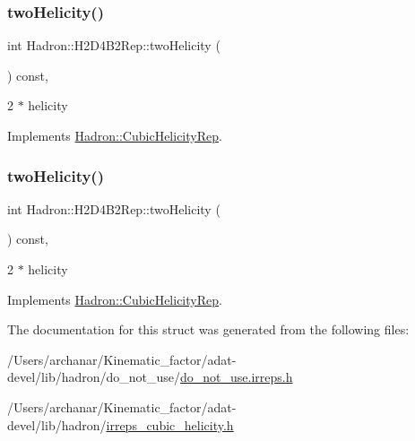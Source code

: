 \subsubsection{\texorpdfstring{twoHelicity()}{twoHelicity()}\hspace{0.1cm}{\footnotesize\ttfamily [2/3]}}
{\footnotesize\ttfamily int Hadron\+::\+H2\+D4\+B2\+Rep\+::two\+Helicity (\begin{DoxyParamCaption}{ }\end{DoxyParamCaption}) const\hspace{0.3cm}{\ttfamily [inline]}, {\ttfamily [virtual]}}

2 $\ast$ helicity 

Implements \mbox{\hyperlink{structHadron_1_1CubicHelicityRep_af507aa56fc2747eacc8cb6c96db31ecc}{Hadron\+::\+Cubic\+Helicity\+Rep}}.

\mbox{\label{structHadron_1_1H2D4B2Rep_a21f6e9059862c9e6f8b6d5cbb10d8b80}} 
\subsubsection{\texorpdfstring{twoHelicity()}{twoHelicity()}\hspace{0.1cm}{\footnotesize\ttfamily [3/3]}}
{\footnotesize\ttfamily int Hadron\+::\+H2\+D4\+B2\+Rep\+::two\+Helicity (\begin{DoxyParamCaption}{ }\end{DoxyParamCaption}) const\hspace{0.3cm}{\ttfamily [inline]}, {\ttfamily [virtual]}}

2 $\ast$ helicity 

Implements \mbox{\hyperlink{structHadron_1_1CubicHelicityRep_af507aa56fc2747eacc8cb6c96db31ecc}{Hadron\+::\+Cubic\+Helicity\+Rep}}.



The documentation for this struct was generated from the following files\+:\begin{DoxyCompactItemize}
\item 
/\+Users/archanar/\+Kinematic\+\_\+factor/adat-\/devel/lib/hadron/do\+\_\+not\+\_\+use/\mbox{\hyperlink{adat-devel_2lib_2hadron_2do__not__use_2do__not__use_8irreps_8h}{do\+\_\+not\+\_\+use.\+irreps.\+h}}\item 
/\+Users/archanar/\+Kinematic\+\_\+factor/adat-\/devel/lib/hadron/\mbox{\hyperlink{adat-devel_2lib_2hadron_2irreps__cubic__helicity_8h}{irreps\+\_\+cubic\+\_\+helicity.\+h}}\end{DoxyCompactItemize}
